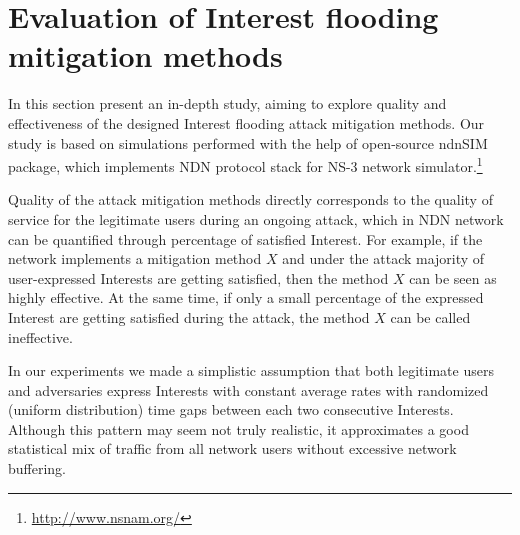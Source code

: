 \section{Evaluation of Interest flooding mitigation methods}
\label{sec:evaluation}




In this section present an in-depth study, aiming to explore quality and effectiveness of the designed Interest flooding attack mitigation methods.
Our study is based on simulations performed with the help of open-source ndnSIM~\cite{ndnsim} package, which implements NDN protocol stack for NS-3 network simulator.\footnote{\url{http://www.nsnam.org/}}


Quality of the attack mitigation methods directly corresponds to the quality of service for the legitimate users during an ongoing attack, which in NDN network can be quantified through percentage of satisfied Interest.
For example, if the network implements a mitigation method $X$ and under the attack majority of user-expressed Interests are getting satisfied, then the method $X$ can be seen as highly effective.
At the same time, if only a small percentage of the expressed Interest are getting satisfied during the attack, the method $X$ can be called ineffective. 

In our experiments we made a simplistic assumption that both legitimate users and adversaries express Interests with constant average rates with randomized (uniform distribution) time gaps between each two consecutive Interests.
Although this pattern may seem not truly realistic, it approximates a good statistical mix of traffic from all network users without excessive network buffering.


